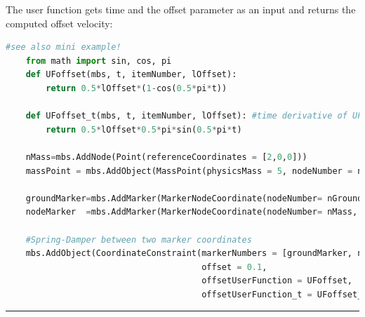     The user function gets time and the offset parameter as an input and returns the computed offset velocity:
    \finishTable
%
    \userFunctionExample{}
    \pythonstyle
    \begin{lstlisting}[language=Python]
    #see also mini example!
    from math import sin, cos, pi
    def UFoffset(mbs, t, itemNumber, lOffset): 
        return 0.5*lOffset*(1-cos(0.5*pi*t))
    
    def UFoffset_t(mbs, t, itemNumber, lOffset): #time derivative of UFoffset
        return 0.5*lOffset*0.5*pi*sin(0.5*pi*t)

    nMass=mbs.AddNode(Point(referenceCoordinates = [2,0,0]))
    massPoint = mbs.AddObject(MassPoint(physicsMass = 5, nodeNumber = nMass))
    
    groundMarker=mbs.AddMarker(MarkerNodeCoordinate(nodeNumber= nGround, coordinate = 0))
    nodeMarker  =mbs.AddMarker(MarkerNodeCoordinate(nodeNumber= nMass, coordinate = 0))
    
    #Spring-Damper between two marker coordinates
    mbs.AddObject(CoordinateConstraint(markerNumbers = [groundMarker, nodeMarker], 
                                       offset = 0.1, 
                                       offsetUserFunction = UFoffset, 
                                       offsetUserFunction_t = UFoffset_t)) 
    \end{lstlisting}
\vspace{6pt}\par\noindent\rule{\textwidth}{0.4pt}
\label{miniExample_ObjectConnectorCoordinate}
\pythonstyle
